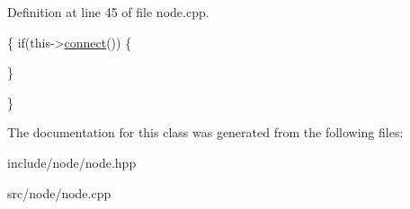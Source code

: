 Definition at line 45 of file node.\-cpp.


\begin{DoxyCode}
\{
        \textcolor{keywordflow}{if}(this->\hyperlink{classlibap2p_1_1node_acaab6b50b4a46a99b53c5e4bb2e78760}{connect}())
        \{
                
        \}
        
\}
\end{DoxyCode}


The documentation for this class was generated from the following files\-:\begin{DoxyCompactItemize}
\item 
include/node/node.\-hpp\item 
src/node/node.\-cpp\end{DoxyCompactItemize}
